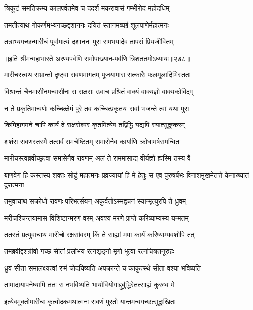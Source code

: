 \twolineshloka
{त्रिकूटं समतिक्रम्य कालपर्वतमेव च}
{ददर्श मकरावासं गम्भीरोदं महोदधिम्}


\twolineshloka
{तमतीत्याथ गोकर्णमभ्यगच्छद्दशाननः}
{दयितं स्तानमव्यग्रं शूलपाणेर्महात्मनः}


\twolineshloka
{तत्राभ्यगच्छन्मारीचं पूर्वामात्यं दशाननः}
{पुरा रामभयादेव तापसं प्रियजीवितम्}


॥इति श्रीमन्महाभारते अरण्यपर्वणि रामोपाख्यान-पर्वणि त्रिशततमोऽध्यायः॥२७८॥




\twolineshloka
{मारीचस्त्वथ सभ्रान्तो दृष्ट्वा रावणमागतम्}
{पूजयामास सत्कारैः फलमूलादिभिस्ततः}


\twolineshloka
{विश्रान्तं चैनमासीनमन्वासीनः स राक्षसः}
{उवाच प्रश्रितं वाक्यं वाक्यज्ञो वाक्यकोविदम्}


\twolineshloka
{न ते प्रकृतिमान्वर्णः कच्चित्क्षेमं पुरे तव}
{कच्चित्प्रकृतयः सर्वा भजन्ते त्वां यथा पुरा}


\twolineshloka
{किमिहागमने चापि कार्यं ते राक्षसेश्वर}
{कृतमित्येव तद्विद्धि यद्यपि स्यात्सुदुष्करम्}


\twolineshloka
{शशंस रावणस्तस्मै तत्सर्वं रामचेष्टितम्}
{समासेनैव कार्याणि क्रोधामर्षसमन्वितः}


\twolineshloka
{मारीचस्त्वब्रवीच्छ्रत्वा समासेनैव रावणम्}
{अलं ते राममासाद्य वीर्यज्ञो ह्यस्मि तस्य वै}


\threelineshloka
{बाणवेगं हि कस्तस्य शक्तः सोढुं महात्मनः}
{प्रव्रज्यायां हि मे हेतुः स एव पुरुषर्षभः}
{विनाशमुखमेतत्ते केनाख्यातं दुरात्मना}


\twolineshloka
{तमुवाचाथ सक्रोधो रावणः परिभर्त्सयन्}
{अकुर्वतोऽस्मद्वचनं स्यान्मृत्युरपि ते ध्रुवम्}


\twolineshloka
{मरीचश्चिन्तयामास विशिष्टान्मरणं वरम्}
{अवश्यं मरणे प्राप्ते करिष्याम्यस्य यन्मतम्}


\twolineshloka
{ततस्तं प्रत्युवाचाथ मारीचो रक्षसांवरम्}
{किं ते साह्यां मया कार्यं करिष्याम्यवशोपि तत्}


\twolineshloka
{तमब्रवीद्दशग्रीवो गच्छ सीतां प्रलोभय}
{रत्नशृङ्गो मृगो भूत्वा रत्नचित्रतनूरुहः}


\twolineshloka
{ध्रुवं सीता समालक्ष्यत्वां रामं चोदयिष्यति}
{अपक्रान्ते च काकुत्स्थे सीता वश्या भविष्यति}


\twolineshloka
{तामादायापनेष्यामि ततः स नभविष्यति}
{भार्यावियोगाद्दुर्बुद्धिरेतत्साह्यं कुरुष्व मे}


\twolineshloka
{इत्येवमुक्तोमारीचः कृत्वोदकमथात्मनः}
{रावणं पुरतो यान्तमन्वगच्छत्सुदुःखितः}



